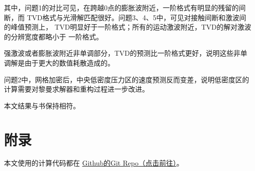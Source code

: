 \documentclass[UTF8,zihao=5]{ctexart} %
\begin{document}
其中，问题1的对比可见，在跨越0点的膨胀波附近，一阶格式有明显的残留的间断，而
TVD格式与光滑解匹配很好。问题3、4、5中，可见对接触间断和激波间的峰值预测上，
TVD明显好于一阶格式；所有的运动激波附近，TVD的解对激波的分辨宽度都略小于
一阶格式。

强激波或者膨胀波附近非单调部分，TVD的预测比一阶格式更好，说明这些非单调解是由于更大的数值耗散造成的。

问题2中，网格加密后，中央低密度压力区的速度预测反而变差，说明低密度区的计算需要对黎曼求解器和重构过程进一步改进。



本文结果与书\cite{2013Riemann}保持相符。

{}



\section*{附录}

本文使用的计算代码都在
\href{https://github.com/harryzhou2000/HW_ACFD}{Github的Git Repo（点击前往）}。

























\end{document}
